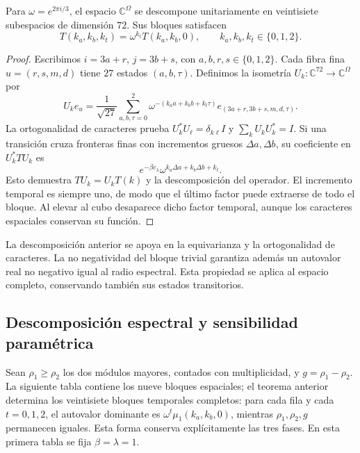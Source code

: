\begin{theorem}
\label{iii:hist:descomposicion}
Para $\omega=e^{2\pi i/3}$, el espacio $\mathbb C^\Omega$ se descompone
unitariamente en veintisiete subespacios de dimensión $72$. Sus bloques
satisfacen
\[
 T(k_a,k_b,k_t)=\omega^{k_t}T(k_a,k_b,0),
 \qquad k_a,k_b,k_t\in\{0,1,2\}.
\]
\end{theorem}
\begin{proof}
Escribimos $i=3a+r$, $j=3b+s$, con $a,b,r,s\in\{0,1,2\}$.
Cada fibra fina $u=(r,s,m,d)$ tiene $27$ estados $(a,b,\tau)$.
Definimos la isometría $U_k:\mathbb C^{72}\to\mathbb C^\Omega$ por
\[
 U_ke_u=\frac1{\sqrt{27}}
 \sum_{a,b,\tau=0}^2
 \omega^{-(k_aa+k_bb+k_t\tau)}e_{(3a+r,3b+s,m,d,\tau)}.
\]
La ortogonalidad de caracteres prueba $U_k^*U_\ell=\delta_{k\ell}I$ y
$\sum_kU_kU_k^*=I$. Si una transición cruza fronteras finas con incrementos
gruesos $\Delta a,\Delta b$, su coeficiente en $U_k^*TU_k$ es
\[
 e^{-\beta c_\lambda}\omega^{k_a\Delta a+k_b\Delta b+k_t}.
\]
Esto demuestra $TU_k=U_kT(k)$ y la descomposición del operador. El incremento
temporal es siempre uno, de modo que el último factor puede extraerse de
todo el bloque. Al elevar al cubo desaparece dicho factor temporal, aunque
los caracteres espaciales conservan su función.
\end{proof}

La descomposición anterior se apoya en la equivarianza y la ortogonalidad
de caracteres. La no negatividad del bloque trivial garantiza además un
autovalor real no negativo igual al radio espectral. Esta propiedad se
aplica al espacio completo, conservando también sus estados transitorios.

\subsection{Descomposición espectral y sensibilidad paramétrica}
\label{iii:hist:espectros}

Sean $\rho_1\geq\rho_2$ los dos módulos mayores, contados con
multiplicidad, y $g=\rho_1-\rho_2$. La siguiente tabla contiene los
nueve bloques espaciales; el teorema anterior determina los veintisiete
bloques temporales completos: para cada fila y cada $t=0,1,2$, el autovalor
dominante es $\omega^t\mu_1(k_a,k_b,0)$, mientras $\rho_1,\rho_2,g$
permanecen iguales. Esta forma conserva explícitamente las tres fases.
En esta primera tabla se fija $\beta=\lambda=1$.

